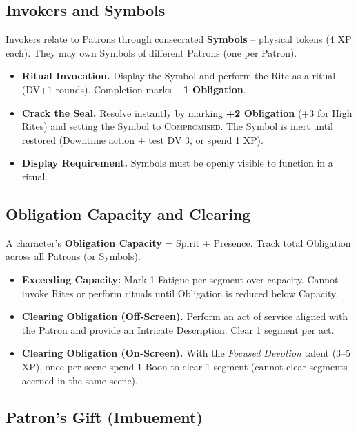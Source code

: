 \subsection{Invokers and Symbols}
\label{subsec:invokers}

Invokers relate to Patrons through consecrated \textbf{Symbols} -- physical tokens (4 XP each). They may own Symbols of different Patrons (one per Patron).

\begin{itemize}
  \item \textbf{Ritual Invocation.} Display the Symbol and perform the Rite as a ritual (DV+1 rounds). Completion marks \textbf{+1 Obligation}.
  \item \textbf{Crack the Seal.} Resolve instantly by marking \textbf{+2 Obligation} (+3 for High Rites) and setting the Symbol to \textsc{Compromised}. The Symbol is inert until restored (Downtime action + test DV 3, or spend 1 XP).
  \item \textbf{Display Requirement.} Symbols must be openly visible to function in a ritual.
\end{itemize}

\subsection{Obligation Capacity and Clearing}
\label{subsec:obligation}

A character's \textbf{Obligation Capacity} = Spirit + Presence. Track total Obligation across all Patrons (or Symbols).

\begin{itemize}
  \item \textbf{Exceeding Capacity:} Mark 1 Fatigue per segment over capacity. Cannot invoke Rites or perform rituals until Obligation is reduced below Capacity.
  \item \textbf{Clearing Obligation (Off‑Screen).} Perform an act of service aligned with the Patron and provide an Intricate Description. Clear 1 segment per act.
  \item \textbf{Clearing Obligation (On‑Screen).} With the \emph{Focused Devotion} talent (3--5 XP), once per scene spend 1 Boon to clear 1 segment (cannot clear segments accrued in the same scene).
\end{itemize}

\subsection{Patron's Gift (Imbuement)}
\label{subsec:patrons-gift}


